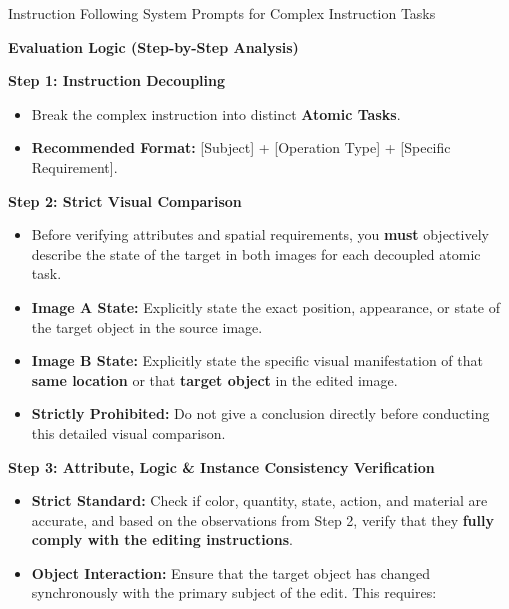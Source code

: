 \begin{promptbox}[label={System Prompts: IF_Complex_Instruction}]{Instruction Following System Prompts for Complex Instruction Tasks}
\medskip

\textbf{Evaluation Logic (Step-by-Step Analysis)}

\medskip

\textbf{Step 1: Instruction Decoupling}

\begin{itemize}
    \item Break the complex instruction into distinct \textbf{Atomic Tasks}.
    
    \item \textbf{Recommended Format:} [Subject] + [Operation Type] + [Specific Requirement].
\end{itemize}

\medskip

\textbf{Step 2: Strict Visual Comparison}

\begin{itemize}[leftmargin=2.2em, labelsep=0.4em, itemsep=2pt]
    \item Before verifying attributes and spatial requirements, you \textbf{must} objectively describe the state of the target in both images for each decoupled atomic task.
    
    \item \textbf{Image A State:} Explicitly state the exact position, appearance, or state of the target object in the source image.
    
    \item \textbf{Image B State:} Explicitly state the specific visual manifestation of that \textbf{same location} or that \textbf{target object} in the edited image.
    
    \item \textbf{Strictly Prohibited:} Do not give a conclusion directly before conducting this detailed visual comparison.
\end{itemize}

\medskip

\textbf{Step 3: Attribute, Logic \& Instance Consistency Verification}

\begin{itemize}[leftmargin=2.2em, labelsep=0.4em, itemsep=2pt]
    \item \textbf{Strict Standard:} Check if color, quantity, state, action, and material are accurate, and based on the observations from Step 2, verify that they \textbf{fully comply with the editing instructions}.
    
    \item \textbf{Object Interaction:} Ensure that the target object has changed synchronously with the primary subject of the edit. This requires:
    

\end{itemize}
\end{promptbox}
